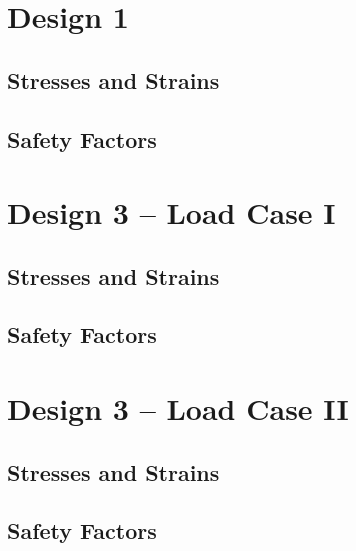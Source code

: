 \documentclass{article} %
\begin{document}
\renewcommand{\arraystretch}{1.2}
\appendix
\thispagestyle{empty}
\section{Design 1}
\subsection{Stresses and Strains}

\subsection{Safety Factors}

\section{Design 3 -- Load Case I}
\thispagestyle{empty}
\subsection{Stresses and Strains}

\subsection{Safety Factors}
\thispagestyle{empty}

\section{Design 3 -- Load Case II}
\subsection{Stresses and Strains}
\thispagestyle{empty}

\subsection{Safety Factors}
\thispagestyle{empty}

\end{document}
